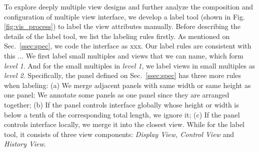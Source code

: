 To explore deeply multiple view designs and further analyze the composition and configuration of multiple view interface,
we develop a label tool (shown in Fig.\ref{fig:vis_process}) to label the view attributes manually.
Before describing the details of the label tool, we list the labeling rules firstly.
As mentioned on Sec.~\ref{ssec:spec}, we code the interface as {\color{red}xxx}. Our label rules are consistent with this ... 
We first label small multiples and views that we can name, which form \textit{level 1}. 
And for the small multiples in \textit{level 1}, we label views in small multiples as \textit{level 2}. 
Specifically, the panel defined on Sec.~\ref{ssec:spec} has three more rules when labeling:
(a)
We merge adjacent panels with same width or same height as one panel; 
We annotate some panels as one panel since they are arranged together; 
(b)
If the panel controls interface globally whose height or width is below a tenth of the corresponding total length, we ignore it; 
(c)
If the panel controls interface locally, we merge it into the closest view.
While for the label tool, it consists of three view components: \textit{Display View, Control View} and \textit{History View}. 

